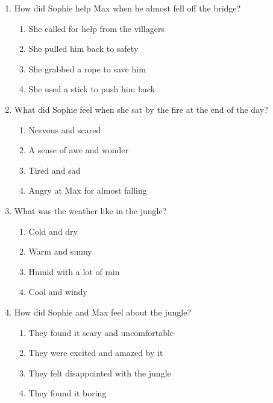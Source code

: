 \documentclass[12pt]{article}
\begin{document}
\begin{enumerate}
    \vspace{0.5cm}

    \item How did Sophie help Max when he almost fell off the bridge?

    \begin{enumerate}[label=\Alph*.]
        \item She called for help from the villagers
        \item She pulled him back to safety
        \item She grabbed a rope to save him
        \item She used a stick to push him back
    \end{enumerate}
    
    \vspace{0.5cm}

    \item What did Sophie feel when she sat by the fire at the end of the day?

    \begin{enumerate}[label=\Alph*.]
        \item Nervous and scared
        \item A sense of awe and wonder
        \item Tired and sad
        \item Angry at Max for almost falling
    \end{enumerate}
    
    \vspace{0.5cm}

    \item What was the weather like in the jungle?

    \begin{enumerate}[label=\Alph*.]
        \item Cold and dry
        \item Warm and sunny
        \item Humid with a lot of rain
        \item Cool and windy
    \end{enumerate}
    
    \vspace{0.5cm}

    \item How did Sophie and Max feel about the jungle?

    \begin{enumerate}[label=\Alph*.]
        \item They found it scary and uncomfortable
        \item They were excited and amazed by it
        \item They felt disappointed with the jungle
        \item They found it boring
    \end{enumerate}
    

\end{enumerate}
\end{document}
